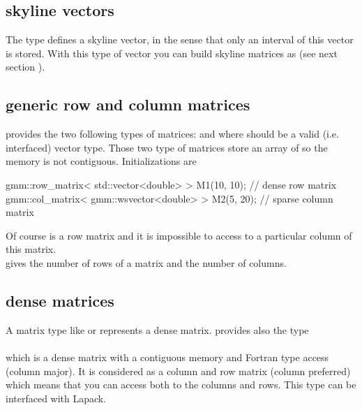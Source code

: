 \documentclass[11pt,a4paper]{article}
\begin{document}
\subsection{skyline vectors}
The type  defines a skyline vector, in the sense that only an interval of this vector is stored. With this type of vector you can build skyline matrices as  (see next section \label{sec:racmat}).

\subsection{generic row and column matrices} \label{sec:racmat}
\gmm provides the two following types of matrices:  and  where  should be a valid (i.e. interfaced) vector type.
Those two type of matrices store an array of  so the memory is not contiguous. Initializations are
\begin{cppcode}
  gmm::row_matrix< std::vector<double> > M1(10, 10);  // dense row matrix
  gmm::col_matrix< gmm::wsvector<double> > M2(5, 20); // sparse column matrix
\end{cppcode}
Of course  is a row matrix and it is impossible to access to a particular column of this matrix. 
\\

 gives the number of rows of a matrix and  the number of columns.

\subsection{dense matrices}
A matrix type like  or  represents a dense matrix. \gmm provides also the type \\[0.2cm]
   \\[0.2cm]
which is a dense matrix with a contiguous memory and Fortran type access (column major). It is considered as a column and row matrix (column preferred) which means that you can access both to the columns and rows. This type can be interfaced with Lapack.
\end{document}
